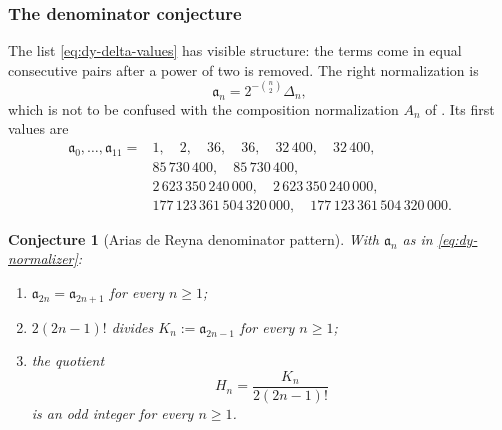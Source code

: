 \documentclass[11pt,oneside]{article}
\newtheorem{conjecture}[theorem]{Conjecture}
\theoremstyle{definition}
\theoremstyle{remark}
\begin{document}
\subsubsection{The denominator conjecture}
\label{subsubsec:dy-denominator-conjecture}

The list \eqref{eq:dy-delta-values} has visible structure: the terms come in equal
consecutive pairs after a power of two is removed.  The right normalization is
\begin{equation}
 \mathfrak a_n=2^{-\binom n2}\Delta_n,
                                                               \label{eq:dy-normalizer}
\end{equation}
which is not to be confused with the composition normalization $A_n$ of
.  Its first values are
\begin{equation}
\begin{split}
 \mathfrak a_0,\ldots,\mathfrak a_{11}={}&1,\quad2,\quad36,\quad36,\quad32\,400,\quad
 32\,400,\\
 &85\,730\,400,\quad85\,730\,400,\\
 &2\,623\,350\,240\,000,\quad2\,623\,350\,240\,000,\\
 &177\,123\,361\,504\,320\,000,\quad177\,123\,361\,504\,320\,000.
\end{split}                                                    \label{eq:dy-normalizer-values}
\end{equation}

\begin{conjecture}[Arias de Reyna denominator pattern]
\label{conj:dy-denominators}
With $\mathfrak a_n$ as in \eqref{eq:dy-normalizer}:
\begin{enumerate}[label=\textup{(\roman*)}]
\item $\mathfrak a_{2n}=\mathfrak a_{2n+1}$ for every $n\ge1$;
\item $2(2n-1)!$ divides $K_n:=\mathfrak a_{2n-1}$ for every $n\ge1$;
\item the quotient
\begin{equation}
 H_n=\frac{K_n}{2(2n-1)!}                                      \label{eq:dy-Hn}
\end{equation}
is an odd integer for every $n\ge1$.
\end{enumerate}
\end{conjecture}
\end{document}
